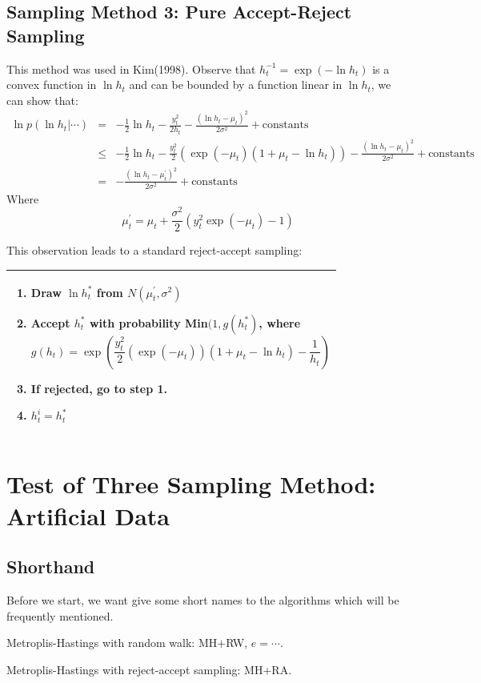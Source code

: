 \documentclass{article}
\begin{document}
\subsection{Sampling Method 3: Pure Accept-Reject Sampling}
This method was used in Kim(1998). Observe that $h_t^{-1}=\exp(-\ln h_t)$ is a convex function in $\ln h_t$ and can be bounded by a function linear in $\ln h_t$, we can show that:
\begin{eqnarray}
\ln{p(\ln h_t|\cdots)}&=&-\frac{1}{2}\ln h_t-\frac{y_t^2}{2h_t}-\frac{(\ln h_t-\mu_t)^2}{2\sigma^2}+\textrm{constants}\nonumber\\
&\leq&-\frac{1}{2}\ln h_t-\frac{y_t^2}{2}\left(\exp(-\mu_t)(1+\mu_t-\ln h_t)\right)-\frac{(\ln h_t-\mu_t)^2}{2\sigma^2}+\textrm{constants}\nonumber\\
&=&-\frac{(\ln h_t-\mu^\prime_t)^2}{2\sigma^2}+\textrm{constants}
\end{eqnarray}
Where
\[
\mu^\prime_t=\mu_t+\frac{\sigma^2}{2}(y_t^2\exp(-\mu_t)-1)
\]

This observation leads to a standard reject-accept sampling:

\begin{tabular}{|p{11cm}|}
\hline
\begin{enumerate}
\item
Draw $\ln h^*_t$ from $N(\mu^\prime_t,\sigma^2)$
\item
Accept $h^*_t$ with probability Min$(1,g(h^*_t)$, where
\[
g(h_t)=\exp(\frac{y_t^2}{2}(\exp(-\mu_t))(1+\mu_t-\ln h_t)-\frac{1}{h_t})
\]
\item
If rejected, go to step 1.
\item
$h^i_t=h^*_t$
\end{enumerate}\\
\hline
\end{tabular}

\section{Test of Three Sampling Method: Artificial Data}
\subsection{Shorthand}
Before we start, we want give some short names to the algorithms which will be frequently mentioned.

Metroplis-Hastings with random walk: MH$+$RW, $e=\cdots$.

Metroplis-Hastings with reject-accept sampling: MH$+$RA.
\end{document}

